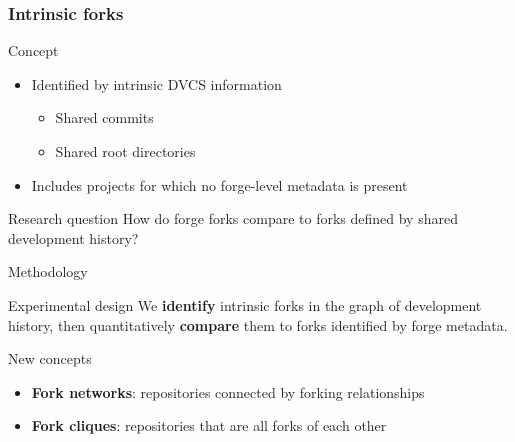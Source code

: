 \documentclass[aspectratio=169,xcolor=table]{beamer}
\begin{document}
    \begin{frame}
        \frametitle{Intrinsic forks}
        \begin{block}{Concept}
            \begin{center}
            \end{center}

            \begin{itemize}
                \item Identified by intrinsic DVCS information
                    \begin{itemize}
                        \item Shared commits
                        \item Shared root directories
                    \end{itemize}
                \item Includes projects for which no forge-level metadata is present
            \end{itemize}
        \end{block}

        \begin{block}{Research question}
            How do forge forks compare to forks defined by shared development
            history?
        \end{block}
    \end{frame}

    \begin{frame}{Methodology}
        \begin{block}{Experimental design}
            We \textbf{identify} intrinsic forks in the graph of development
            history, then quantitatively \textbf{compare} them to forks
            identified by forge metadata.
        \end{block}

        \begin{block}{New concepts}
            \begin{itemize}
                \item \textbf{Fork networks}: repositories connected by
                    forking relationships
                \item \textbf{Fork cliques}: repositories that are all forks of
                    each other
            \end{itemize}
        \end{block}
    \end{frame}
\end{document}
